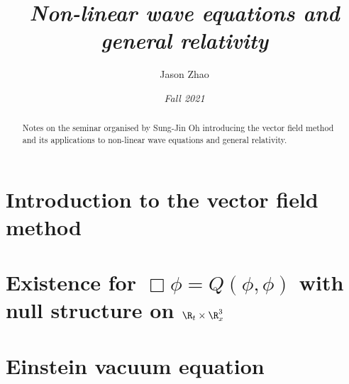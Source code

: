 \documentclass[10pt, reqno]{article}
\title
{
	\emph{Non-linear wave equations and general relativity}
}
\author{Jason Zhao}
\date{\emph{Fall 2021}}
\theoremstyle{definition}
\theoremstyle{remark}
\begin{document}
\maketitle

\begin{abstract}
	Notes on the seminar organised by Sung-Jin Oh introducing the vector field method and its applications to non-linear wave equations and general relativity. 
\end{abstract}

\tableofcontents

\section{Introduction to the vector field method}


\section{Existence for $\Box \phi = Q(\phi, \phi)$ with null structure on $\R_t \times \R^3_x$}


\section{Einstein vacuum equation}



 
\end{document}
